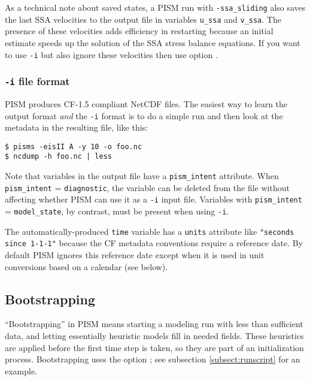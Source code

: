 As a technical note about saved states, a PISM run with \texttt{-ssa_sliding} also saves the last SSA velocities to the output file in variables \texttt{u_ssa} and \texttt{v_ssa}.  The presence of these velocities adds efficiency in restarting because an initial estimate speeds up the solution of the SSA stress balance equations.  If you want to use \texttt{-i} but also ignore these velocities then use option .

\subsubsection*{\texttt{-i} file format}
\label{sec:i-format}
PISM produces CF-1.5 compliant NetCDF files.  The easiest way to learn the output format \emph{and} the \texttt{-i} format is to do a simple run and then look at the metadata in the resulting file, like this:
\begin{verbatim}
$ pisms -eisII A -y 10 -o foo.nc
$ ncdump -h foo.nc | less
\end{verbatim}

Note that variables in the output file have a \texttt{pism_intent} attribute.  When \texttt{pism_intent} = \texttt{diagnostic}, the variable can be deleted from the file without affecting whether PISM can use it as a \texttt{-i} input file.  Variables with \texttt{pism_intent} = \texttt{model_state}, by contrast, must be present when using \texttt{-i}.

The automatically-produced \texttt{time} variable has a \texttt{units} attribute like \texttt{"seconds since 1-1-1"} because the CF metadata conventions require a reference date.  By default PISM ignores this reference date except when it is used in unit conversions based on a calendar (see below).


\subsection{Bootstrapping}
\label{sec:bootstrapping}

``Bootstrapping'' in PISM means starting a modeling run with less than sufficient data, and letting essentially heuristic models fill in needed fields.  These heuristics are applied before the first time step is taken, so they are part of an initialization process.  Bootstrapping uses the option ; see subsection \ref{subsect:runscript} for an example.

